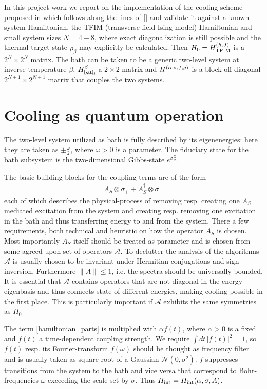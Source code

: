 \documentclass[11pt,a4paper]{article}
\begin{document}
In this project work we report on the implementation of the cooling scheme proposed in \cite{} which follows along the lines of \eqref{} and validate it against a known system Hamiltonian, the TFIM (transverse field Ising model) Hamiltonian and small system sizes $N=4-8$, where exact diagonalization is still possible and the thermal target state $\rho_{\beta}$ may explicitly be calculated. Then $H_0 = H_{\rm TFIM}^{(h,J)}$ is a $2^N \times 2^N$ matrix. The bath can be taken to be a generic two-level system at inverse temperature $\beta$, $H_{\rm bath}^{\beta}$ a $2\times 2$ matrix and $H_{\rm}^{(\alpha, \sigma, f, g)}$ is  a block off-diagonal $2^{N+1} \times 2^{N+1}$ matrix that couples the two systems. 


\section{Cooling as quantum operation}
The two-level system utilized as bath is fully described by its eigenenergies: here they are taken as $\pm \tfrac{\omega}{2}$, where $\omega>0$ is a parameter. The fiduciary state for the bath subsystem is the two-dimensional Gibbs-state $e^{\beta \tfrac{Z}{2}}$.

The basic building blocks for the coupling terms are of the form
\begin{align}\label{single_cooling_process}
    A_S \otimes \sigma_+ +A_S^{\dagger} \otimes \sigma_- 
\end{align}
each of which describes the physical-process of removing resp. creating one  $A_S$ mediated excitation from the system and creating resp. removing one excitation in the bath and thus transferring energy to and from the system. There a few requirements, both technical and heuristic on how the operator $A_S$ is chosen. Most importantly $A_S$ itself should be treated as parameter and is chosen from some agreed upon set of operators $\mathcal{A}$. To declutter the analysis of the algorithms $\mathcal{A}$ is usually chosen to be invariant under Hermitian conjugations and sign inversion. Furthermore $\|A\|\le 1$, i.e. the spectra should be universally bounded. It is essential that $\mathcal{A}$ contains operators that are not diagonal in the energy-eigenbasis and thus connects state of different energies, making cooling possible in the first place. This is particularly important if $\mathcal{A}$ exhibits the same symmetries as $H_0$

The term \autoref{hamiltonian_parts} is multiplied with $\alpha f(t)$, where $\alpha >0$ is a fixed and $f(t)$ a time-dependent coupling strength. We require $\int dt \, |f(t)|^2  = 1$, so $f(t)$ resp. its Fourier-transform $f(\omega)$ should be thought as frequency filter and is usually taken as square-root of a Gaussian $\mathcal{N}(0,\sigma^2)$. $f$ suppresses transitions from the system to the bath and vice versa that correspond to Bohr-frequencies $\omega$ exceeding the scale set by $\sigma$. Thus $H_{\rm int} =  H_{\rm int}(\alpha, \sigma, A)$. 
\end{document}
